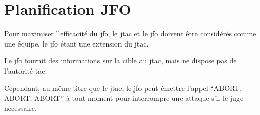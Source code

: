 \section{Planification JFO}

Pour maximiser l'efficacité du \gls{jfo}, le \gls{jtac} et le \gls{jfo} doivent être considérés comme une équipe, le \gls{jfo} étant une extension du \gls{jtac}.

Le \gls{jfo} fournit des informations sur la cible au \gls{jtac}, mais ne dispose pas de l'autorité \gls{tac}.

Cependant, au même titre que le \gls{jtac}, le \gls{jfo} peut émettre l'appel ``ABORT, ABORT, ABORT'' à tout moment pour interrompre une attaque s'il le juge nécessaire.